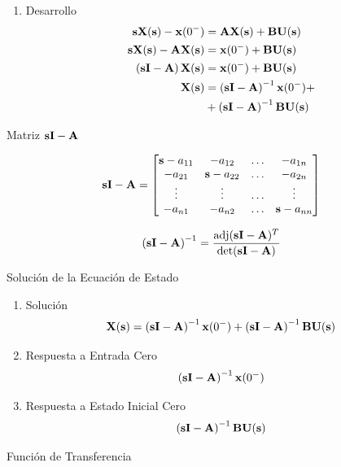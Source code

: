 \begin{enumerate}
\item Desarrollo
\label{sec:org3089165}
\begin{align*}
  \mathbf{s} \mathbf{X}(\mathbf{s}) - \mathbf{x}(0^-) &= \mathbf{A}\mathbf{X}(\mathbf{s}) + \mathbf{B}\mathbf{U}(\mathbf{s})\\
  \mathbf{s} \mathbf{X}(\mathbf{s}) - \mathbf{A}\mathbf{X}(\mathbf{s}) &= \mathbf{x}(0^-) + \mathbf{B}\mathbf{U}(\mathbf{s})\\
  \left(\mathbf{s} \mathbf{I} - \mathbf{A} \right) \mathbf{X}(\mathbf{s}) &= \mathbf{x}(0^-) + \mathbf{B}\mathbf{U}(\mathbf{s})\\
  \mathbf{X}(\mathbf{s}) &= \left(\mathbf{s} \mathbf{I} - \mathbf{A} \right)^{-1} \mathbf{x}(0^-) +\\ 
  &+ \left(\mathbf{s} \mathbf{I} - \mathbf{A} \right)^{-1} \mathbf{B}\mathbf{U}(\mathbf{s})
\end{align*}
\end{enumerate}

{Matriz \(\mathbf{s} \mathbf{I} - \mathbf{A}\)}

\[
\mathbf{s} \mathbf{I} - \mathbf{A} = 
\begin{bmatrix} 
\mathbf{s} - a_{11} & -a_{12} & \dots & -a_{1n}\\
- a_{21} & \mathbf{s} -a_{22} & \dots & -a_{2n}\\
\vdots & \vdots & \dots & \vdots \\
- a_{n1} & -a_{n2} & \dots & \mathbf{s} - a_{nn}
\end{bmatrix}
\]

\[
\left(\mathbf{s} \mathbf{I} - \mathbf{A} \right)^{-1} = \frac{\text{adj}(\mathbf{s} \mathbf{I} - \mathbf{A})^T}{\det(\mathbf{s} \mathbf{I} - \mathbf{A})}
\]

{Solución de la Ecuación de Estado}

\begin{enumerate}
\item Solución
\label{sec:orgf5ba1ec}
\[
  \mathbf{X}(\mathbf{s}) = \left(\mathbf{s} \mathbf{I} - \mathbf{A} \right)^{-1} \mathbf{x}(0^-) + \left(\mathbf{s} \mathbf{I} - \mathbf{A} \right)^{-1} \mathbf{B}\mathbf{U}(\mathbf{s})
\]

\item Respuesta a Entrada Cero
\label{sec:orga98317c}
\[
  \left(\mathbf{s} \mathbf{I} - \mathbf{A} \right)^{-1} \mathbf{x}(0^-)
\]

\item Respuesta a Estado Inicial Cero
\label{sec:org08c4cd6}
\[
  \left(\mathbf{s} \mathbf{I} - \mathbf{A} \right)^{-1} \mathbf{B}\mathbf{U}(\mathbf{s})
\]
\end{enumerate}

{Función de Transferencia}

